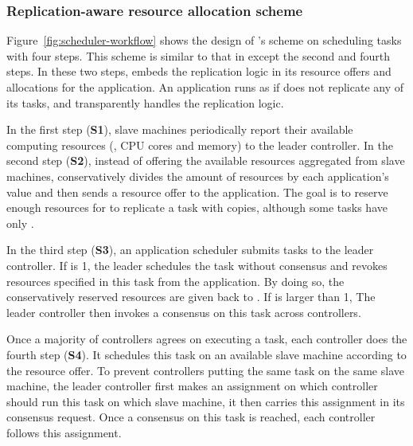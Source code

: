 \vspace{-.3in}
\subsubsection{Replication-aware resource allocation scheme}
\label{sec:workflow}\vspace{-.075in}

Figure~\ref{fig:scheduler-workflow} shows the design of \tripod's scheme on 
scheduling tasks with four steps. This scheme is similar to that in \mesos 
except the second and fourth steps. In these two steps, \tripod embeds the 
replication logic in its resource offers and allocations for the application. 
An application runs as if \xxx does not replicate any of its tasks, and \tripod 
transparently handles the replication logic.

In the first step (\textbf{S1}), slave machines periodically report their 
available computing resources (\eg, CPU cores and memory) to the leader 
controller. In the second step (\textbf{S2}), instead of offering the available 
resources aggregated from slave machines, \tripod conservatively divides the 
amount of resources by each application's  value and then sends a 
resource offer to the application. The goal is to reserve enough resources for 
\tripod to replicate a task with  copies, although some tasks have only 
.

In the third step (\textbf{S3}), an application scheduler submits tasks to the 
leader controller. If  is 1, the leader schedules the task without 
consensus and revokes  resources specified in this task from the 
application. By doing so, the conservatively reserved resources are given back 
to \tripod. If  is larger than 1, The leader controller then invokes a 
consensus on this task across controllers.

Once a majority of controllers agrees on executing a task, each controller 
does the fourth step  (\textbf{S4}). It schedules this task on an available 
slave machine according to the resource offer. To prevent controllers putting 
the same task on the same slave machine, the leader controller first makes an 
assignment on which controller should run this task on which slave machine, it 
then carries this assignment in its consensus request. Once a consensus on this 
task is reached, each controller follows this assignment.



